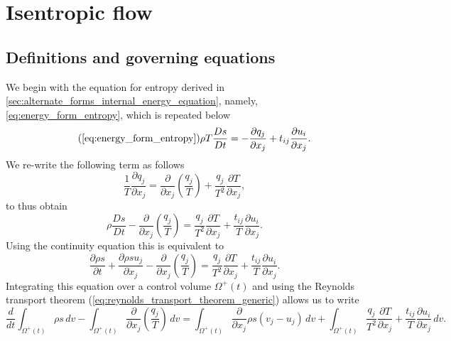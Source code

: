 \documentclass[oneside,a4paper,11pt]{report}
\begin{document}
%
\chapter{Isentropic flow}
%
\section{Definitions and governing equations}
We begin with the equation for entropy derived in \cref{sec:alternate_forms_internal_energy_equation}, namely, \cref{eq:energy_form_entropy}, which is repeated below
\begin{equation}
\tag{\ref{eq:energy_form_entropy}}
    \rho T \frac{Ds}{Dt} = -\frac{\partial q_j}{\partial x_j} + t_{ij} \frac{\partial u_i}{\partial x_j}.
\end{equation}
We re-write the following term as follows
\begin{equation}
    \frac{1}{T} \frac{\partial q_j}{\partial x_j} = \frac{\partial}{\partial x_j} \left ( \frac{q_j}{T} \right ) + \frac{q_j}{T^2}\frac{\partial T}{\partial x_j},
\end{equation}
to thus obtain
\begin{equation}
    \rho \frac{Ds}{Dt} - \frac{\partial}{\partial x_j} \left ( \frac{q_j}{T} \right ) = \frac{q_j}{T^2}\frac{\partial T}{\partial x_j} + \frac{t_{ij}}{T} \frac{\partial u_i}{\partial x_j}.
\end{equation}
Using the continuity equation this is equivalent to
\begin{equation}
    \frac{\partial \rho s}{\partial t} + \frac{\partial \rho s u_j}{\partial x_j} - \frac{\partial}{\partial x_j} \left ( \frac{q_j}{T} \right ) = \frac{q_j}{T^2}\frac{\partial T}{\partial x_j} + \frac{t_{ij}}{T} \frac{\partial u_i}{\partial x_j}.
\end{equation}
Integrating this equation over a control volume $\Omega^+(t)$ and using the Reynolds transport theorem (\cref{eq:reynolds_transport_theorem_generic}) allows us to write
\begin{equation}
    \frac{d}{dt} \int_{\Omega^+(t)} \rho s \, dv - \int_{\Omega^+(t)} \frac{\partial}{\partial x_j} \left ( \frac{q_j}{T} \right ) \,dv = \int_{\Omega^+(t)} \frac{\partial}{\partial x_j} \rho s \left (v_j - u_j \right ) \, dv + \int_{\Omega^+(t)} \frac{q_j}{T^2}\frac{\partial T}{\partial x_j} + \frac{t_{ij}}{T} \frac{\partial u_i}{\partial x_j} \, dv.
\end{equation}
\end{document}
